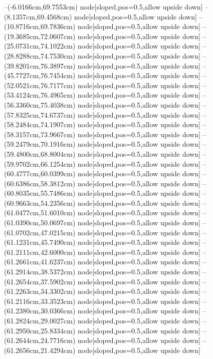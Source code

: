 --(-6.0166cm,69.7553cm) node[sloped,pos=0.5,allow upside down]{\ArrowIn}
--(8.1357cm,69.4568cm) node[sloped,pos=0.5,allow upside down]{\ArrowIn}
--(10.8716cm,69.7836cm) node[sloped,pos=0.5,allow upside down]{\ArrowIn}
--(19.3685cm,72.0607cm) node[sloped,pos=0.5,allow upside down]{\ArrowIn}
--(25.0731cm,74.1022cm) node[sloped,pos=0.5,allow upside down]{\ArrowIn}
--(28.8288cm,74.7530cm) node[sloped,pos=0.5,allow upside down]{\ArrowIn}
--(39.8201cm,76.3897cm) node[sloped,pos=0.5,allow upside down]{\ArrowIn}
--(45.7727cm,76.7454cm) node[sloped,pos=0.5,allow upside down]{\ArrowIn}
--(52.0521cm,76.7177cm) node[sloped,pos=0.5,allow upside down]{\ArrowIn}
--(53.4124cm,76.4965cm) node[sloped,pos=0.5,allow upside down]{\ArrowIn}
--(56.3360cm,75.4038cm) node[sloped,pos=0.5,allow upside down]{\ArrowIn}
--(57.8325cm,74.6737cm) node[sloped,pos=0.5,allow upside down]{\ArrowIn}
--(58.2484cm,74.1907cm) node[sloped,pos=0.5,allow upside down]{\arrowIn}
--(58.3157cm,73.9667cm) node[sloped,pos=0.5,allow upside down]{\arrowIn}
--(59.2479cm,70.1916cm) node[sloped,pos=0.5,allow upside down]{\ArrowIn}
--(59.4800cm,68.8004cm) node[sloped,pos=0.5,allow upside down]{\ArrowIn}
--(59.9702cm,66.1254cm) node[sloped,pos=0.5,allow upside down]{\ArrowIn}
--(60.4777cm,60.0399cm) node[sloped,pos=0.5,allow upside down]{\ArrowIn}
--(60.6386cm,58.3812cm) node[sloped,pos=0.5,allow upside down]{\ArrowIn}
--(60.8035cm,55.7486cm) node[sloped,pos=0.5,allow upside down]{\ArrowIn}
--(60.9663cm,54.2356cm) node[sloped,pos=0.5,allow upside down]{\ArrowIn}
--(61.0477cm,51.6010cm) node[sloped,pos=0.5,allow upside down]{\ArrowIn}
--(61.0390cm,50.0697cm) node[sloped,pos=0.5,allow upside down]{\ArrowIn}
--(61.0702cm,47.0215cm) node[sloped,pos=0.5,allow upside down]{\ArrowIn}
--(61.1231cm,45.7490cm) node[sloped,pos=0.5,allow upside down]{\ArrowIn}
--(61.2111cm,42.6000cm) node[sloped,pos=0.5,allow upside down]{\ArrowIn}
--(61.2661cm,41.6237cm) node[sloped,pos=0.5,allow upside down]{\arrowIn}
--(61.2914cm,38.5372cm) node[sloped,pos=0.5,allow upside down]{\ArrowIn}
--(61.2654cm,37.5902cm) node[sloped,pos=0.5,allow upside down]{\arrowIn}
--(61.2263cm,34.3302cm) node[sloped,pos=0.5,allow upside down]{\ArrowIn}
--(61.2116cm,33.3523cm) node[sloped,pos=0.5,allow upside down]{\arrowIn}
--(61.2380cm,30.0366cm) node[sloped,pos=0.5,allow upside down]{\ArrowIn}
--(61.2824cm,29.0027cm) node[sloped,pos=0.5,allow upside down]{\ArrowIn}
--(61.2950cm,25.8334cm) node[sloped,pos=0.5,allow upside down]{\ArrowIn}
--(61.2644cm,24.7716cm) node[sloped,pos=0.5,allow upside down]{\ArrowIn}
--(61.2656cm,21.4294cm) node[sloped,pos=0.5,allow upside down]{\ArrowIn}
